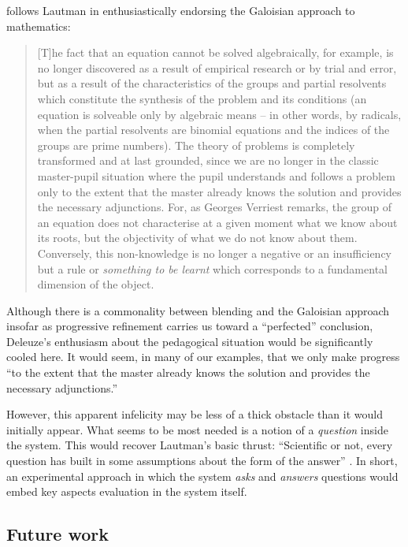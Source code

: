 \cite[pp. 227--228]{deleuze1994difference} follows
Lautman in enthusiastically endorsing the Galoisian approach to
mathematics:
\begin{quote}
[T]he fact that an equation cannot be solved algebraically, for
example, is no longer discovered as a result of empirical research or
by trial and error, but as a result of the characteristics of the
groups and partial resolvents which constitute the synthesis of the
problem and its conditions (an equation is solveable only by algebraic
means -- in other words, by radicals, when the partial resolvents are
binomial equations and the indices of the groups are prime numbers).
The theory of problems is completely transformed and at last grounded,
since we are no longer in the classic master-pupil situation where the
pupil understands and follows a problem only to the extent that the
master already knows the solution and provides the necessary
adjunctions.  For, as Georges Verriest remarks, the group of an
equation does not characterise at a given moment what we know about
its roots, but the objectivity of what we do not know about them.
Conversely, this non-knowledge is no longer a negative or an
insufficiency but a rule or \emph{something to be learnt} which
corresponds to a fundamental dimension of the object.
\end{quote}

Although there is a commonality between blending and the
Galoisian approach insofar as progressive refinement carries us toward a
``perfected'' conclusion, Deleuze's enthusiasm about the pedagogical
situation would be significantly cooled here.  It would seem, in many
of our examples, that we only make progress ``to the extent that the
master already knows the solution and provides the necessary
adjunctions.''

However, this apparent infelicity may be less of a thick obstacle than
it would initially appear.  What seems to be most needed is a notion
of a \emph{question} inside the system.  This would recover Lautman's
basic thrust: ``Scientific or not, every question has built in some
assumptions about the form of the answer'' \cite{larvor2011albert}.
In short, an experimental approach in which the system \emph{asks} and
\emph{answers} questions would embed key aspects evaluation in the
system itself.

\subsection{Future work}

